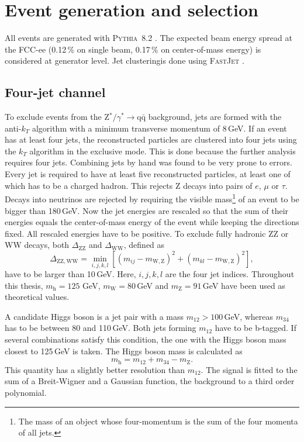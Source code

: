 \section{Event generation and selection}
All events are generated with \textsc{Pythia~8.2} \cite{pythia82}. The expected beam energy spread at the FCC-ee (0.12\,\% on single beam, 0.17\,\% on center-of-mass energy) is considered at generator level. Jet clusteringis done using \textsc{FastJet} \cite{fastjet}.

\subsection{Four-jet channel}
To exclude events from the Z$^*/\gamma^* \rightarrow \mathrm{q\bar{q}}$ background, jets are formed with the anti-$k_T$ algorithm \cite{antikt_algo} with a minimum transverse momentum of 8\,GeV. If an event has at least four jets, the reconstructed particles are clustered into four jets using the $k_T$ algorithm \cite{kt_algo} in the exclusive mode. This is done because the further analysis requires four jets. Combining jets by hand was found  to be very prone to errors.
Every jet is required to have at least five reconstructed particles,  at least one of which has to be a charged hadron. This rejects Z decays into pairs of $e$, $\mu$ or $\tau$. Decays into neutrinos are rejected by requiring the visible mass\footnote{The mass of an object whose four-momentum is the sum of the four momenta of all jets.} of an event to be bigger than 180\,GeV. Now the jet energies are rescaled so that the sum of their energies equals the center-of-mass energy of the event while keeping the directions fixed. 
All rescaled energies have to be positive.
To exclude fully hadronic ZZ or WW decays, both $\Delta_\mathrm{ZZ}$ and $\Delta_\mathrm{WW}$, defined as
\begin{equation}
\Delta_\mathrm{ZZ, WW} = \min_{i, j, k, l} [(m_{ij} - m_\mathrm{W, Z})^2 + (m_{kl} - m_\mathrm{W, Z})^2],
\end{equation}
have to be larger than 10\,GeV. Here, $i, j, k, l$ are the four jet indices. Throughout this thesis, $m_\mathrm{h} = 125\,$\,GeV, $m_\mathrm{W} = 80$\,GeV and  $m_\mathrm{Z} = 91$\,GeV have been used as theoretical values.

A candidate Higgs boson is a jet pair with a mass $m_{12} > 100$\,GeV, whereas $m_{34}$ has to be between 80 and 110\,GeV. Both jets forming $m_{12}$ have to be b-tagged. If several combinations satisfy this condition, the one with the Higgs boson mass closest to 125\,GeV is taken. The Higgs boson mass is calculated as
\begin{equation}
  m_\mathrm{h} = m_{12} + m_{34} - m_\mathrm{Z}.
\label{eq:higgsmass}
\end{equation}
This quantity has a slightly better resolution than $m_{12}$.
The signal is fitted to the sum of a Breit-Wigner and a Gaussian function, the background to a third order polynomial.
